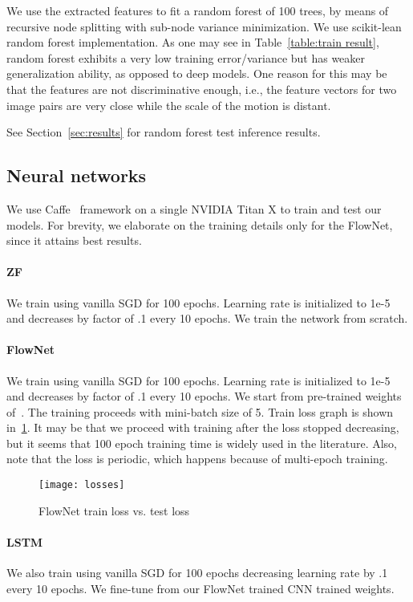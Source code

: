 We use the extracted features to fit a random forest of 100 trees, by
means of recursive node splitting with sub-node variance minimization.
We use scikit-lean~\cite{scikit-learn} random forest implementation.
As one may see in Table~\ref{table:train result}, random forest
exhibits a very low training error/variance but has weaker
generalization ability, as opposed to deep models.  One reason for
this may be that the features are not discriminative enough, i.e., the
feature vectors for two image pairs are very close while the scale of
the motion is distant.

See Section~\ref{sec:results} for random forest test inference
results.

\subsection{Neural networks}

We use Caffe~\cite{jia2014caffe} framework on a single NVIDIA Titan X
to train and test our models. For brevity, we elaborate on the
training details only for the FlowNet, since it attains best results.

\paragraph{ZF} We train using vanilla SGD for 100 epochs. Learning
rate is initialized to 1e-5 and decreases by factor of .1 every 10
epochs. We train the network from scratch.


\paragraph{FlowNet} We train using vanilla SGD for 100
epochs. Learning rate is initialized to 1e-5 and decreases by factor
of .1 every 10 epochs. We start from pre-trained weights
of~\cite{fischer2015flownet}. The training proceeds with mini-batch
size of 5. Train loss graph is shown in~\ref{fig:flownet_train_loss}.
It may be that we proceed with training after the loss stopped
decreasing, but it seems that 100 epoch training time is widely used
in the literature.  Also, note that the loss is periodic, which
happens because of multi-epoch training.  
\begin{figure}[!ht]
  \centering
  \texttt{[image: losses]}
  \caption{FlowNet train loss vs. test loss}
  \label{fig:flownet_train_loss}
\end{figure}

\paragraph{LSTM} We also train using vanilla SGD for 100 epochs
decreasing learning rate by .1 every 10 epochs.  We fine-tune from our
FlowNet trained CNN trained weights.

